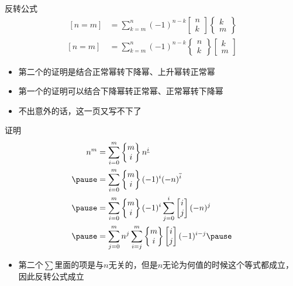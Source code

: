 \documentclass{beamer}
\begin{document}
\begin{frame}{反转公式}
    $$\begin{aligned}
        \ [n = m] &= \sum_{k = m}^n(-1)^{n - k}\begin{bmatrix}n\\ k\end{bmatrix}\begin{Bmatrix}k\\ m\end{Bmatrix}\\
        [n = m] &= \sum_{k = m}^n(-1)^{n - k}\begin{Bmatrix}n\\ k\end{Bmatrix}\begin{bmatrix}k\\ m\end{bmatrix}
    \end{aligned}$$ \pause
    \begin{itemize}
        \item 第二个的证明是结合正常幂转下降幂、上升幂转正常幂
        \item 第一个的证明可以结合下降幂转正常幂、正常幂转下降幂 \pause
        \item 不出意外的话，这一页又写不下了
    \end{itemize}
\end{frame}

\begin{frame}{证明}
    $$\begin{aligned}
        n^m &= \sum_{i = 0}^m\begin{Bmatrix}m\\ i\end{Bmatrix}n^{\underline{i}}\\ \pause
            &= \sum_{i = 0}^m\begin{Bmatrix}m\\ i\end{Bmatrix}(-1)^i(-n)^{\overline{i}}\\ \pause
            &= \sum_{i = 0}^m\begin{Bmatrix}m\\ i\end{Bmatrix}(-1)^i\sum_{j = 0}^i\begin{bmatrix}i\\ j\end{bmatrix}(-n)^j\\ \pause
            &= \sum_{j = 0}^mn^j\sum_{i = j}^m\begin{Bmatrix}m\\ i\end{Bmatrix}\begin{bmatrix}i\\ j\end{bmatrix}(-1)^{i-j} \pause
    \end{aligned}$$
    \begin{itemize}
        \item 第二个$\sum$里面的项是与$n$无关的，但是$n$无论为何值的时候这个等式都成立，因此反转公式成立
    \end{itemize}
\end{frame}
\end{document}
